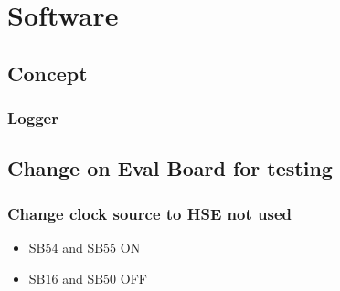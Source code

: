 \section{Software}

\subsection{Concept}

\subsubsection{Logger}


\subsection{Change on Eval Board for testing}

\subsubsection{Change clock source to HSE not used}
\begin{itemize}
	\item SB54 and SB55 ON
	\item SB16 and SB50 OFF
\end{itemize}